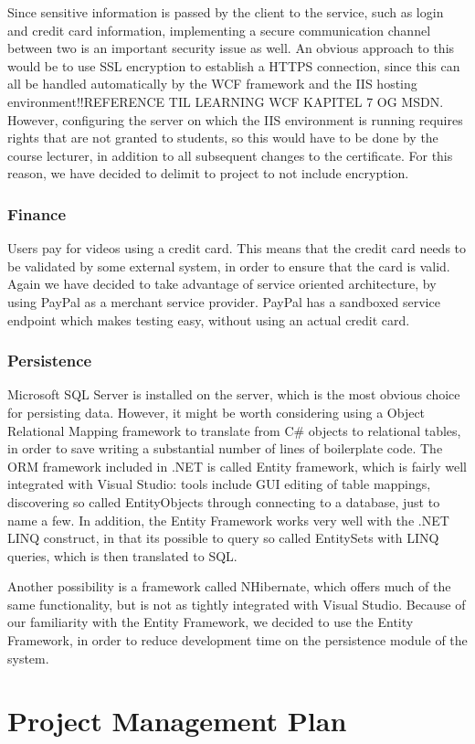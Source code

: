 Since sensitive information is passed by the client to the service, such as login and credit card information, implementing a secure communication channel between two is an important security issue as well. An obvious approach to this would be to use SSL encryption to establish a HTTPS connection, since this can all be handled automatically by the WCF framework and the IIS hosting environment!!REFERENCE TIL LEARNING WCF KAPITEL 7 OG MSDN. However, configuring the server on which  the IIS environment is running requires rights that are not granted to students, so this would have to be done by the course lecturer, in addition to all subsequent changes to the certificate. For this reason, we have decided to delimit to project to not include encryption.

\subsubsection{Finance}
Users pay for videos using a credit card. This means that the credit card needs to be validated by some external system, in order to ensure that the card is valid. Again we have decided to take advantage of service oriented architecture, by using PayPal as a merchant service provider. PayPal has a sandboxed service endpoint which makes testing easy, without using an actual credit card.

\subsubsection{Persistence}
Microsoft SQL Server is installed on the server, which is the most obvious choice for persisting data. However, it might be worth considering using a Object Relational Mapping framework to translate from C\# objects to relational tables, in order to save writing a substantial number of lines of boilerplate code. The ORM framework included in .NET is called Entity framework, which is fairly well integrated with Visual Studio: tools include GUI editing of table mappings, discovering so called EntityObjects through connecting to a database, just to name a few. In addition, the Entity Framework works very well with the .NET LINQ construct, in that its possible to query so called EntitySets with LINQ queries, which is then translated to SQL.

Another possibility is a framework called NHibernate, which offers much of the same functionality, but is not as tightly integrated with Visual Studio. Because of our familiarity with the Entity Framework, we decided to use the Entity Framework, in order to reduce development time on the persistence module of the system.

\section{Project Management Plan}